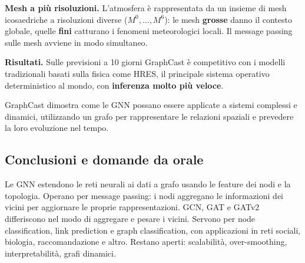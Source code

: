 \documentclass[11pt,a4paper]{article}
\begin{document}
\textbf{Mesh a più risoluzioni.} L'atmosfera è rappresentata da un insieme di
mesh icosaedriche a risoluzioni diverse ($M^0,\dots,M^6$): le mesh \textbf{grosse}
danno il contesto globale, quelle \textbf{fini} catturano i fenomeni meteorologici
locali. Il message passing sulle mesh avviene in modo simultaneo.
 
\textbf{Risultati.} Sulle previsioni a 10 giorni GraphCast è competitivo con i
modelli tradizionali basati sulla fisica come HRES, il principale sistema
operativo deterministico al mondo, con \textbf{inferenza molto più veloce}.

\begin{osservazione} GraphCast dimostra come le GNN
possano essere applicate a sistemi complessi e dinamici,
utilizzando un grafo per rappresentare le relazioni
spaziali e prevedere la loro evoluzione nel tempo.
\end{osservazione}
 
\subsection{Conclusioni e domande da orale}
 
Le GNN estendono le reti neurali ai dati a grafo usando le feature dei nodi e la
topologia. Operano per message passing: i nodi aggregano le informazioni dei
vicini per aggiornare le proprie rappresentazioni. GCN, GAT e GATv2 differiscono
nel modo di aggregare e pesare i vicini. Servono per node classification, link
prediction e graph classification, con applicazioni in reti sociali, biologia,
raccomandazione e altro. Restano aperti: scalabilità, over-smoothing,
interpretabilità, grafi dinamici.
 
\end{document}
